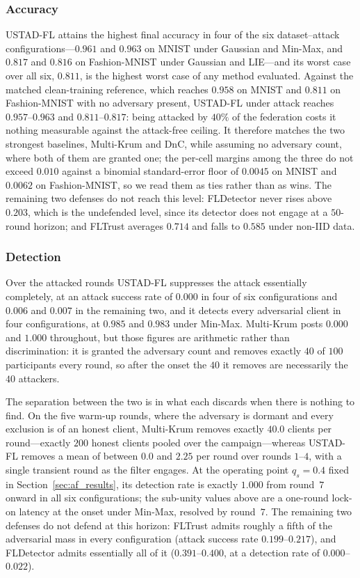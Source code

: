 \documentclass[journal]{IEEEtran}
\begin{document}
\subsubsection{Accuracy}
USTAD-FL attains the highest final accuracy in four of the six dataset--attack configurations---$0.961$ and $0.963$ on MNIST under Gaussian and Min-Max, and $0.817$ and $0.816$ on Fashion-MNIST under Gaussian and LIE---and its worst case over all six, $0.811$, is the highest worst case of any method evaluated. Against the matched clean-training reference, which reaches $0.958$ on MNIST and $0.811$ on Fashion-MNIST with no adversary present, USTAD-FL under attack reaches $0.957$--$0.963$ and $0.811$--$0.817$: being attacked by $40\%$ of the federation costs it nothing measurable against the attack-free ceiling. It therefore matches the two strongest baselines, Multi-Krum and DnC, while assuming no adversary count, where both of them are granted one; the per-cell margins among the three do not exceed $0.010$ against a binomial standard-error floor of $0.0045$ on MNIST and $0.0062$ on Fashion-MNIST, so we read them as ties rather than as wins. The remaining two defenses do not reach this level: FLDetector never rises above $0.203$, which is the undefended level, since its detector does not engage at a $50$-round horizon; and FLTrust averages $0.714$ and falls to $0.585$ under non-IID data.

\subsubsection{Detection}
Over the attacked rounds USTAD-FL suppresses the attack essentially completely, at an attack success rate of $0.000$ in four of six configurations and $0.006$ and $0.007$ in the remaining two, and it detects every adversarial client in four configurations, at $0.985$ and $0.983$ under Min-Max. Multi-Krum posts $0.000$ and $1.000$ throughout, but those figures are arithmetic rather than discrimination: it is granted the adversary count and removes exactly $40$ of $100$ participants every round, so after the onset the $40$ it removes are necessarily the $40$ attackers.

The separation between the two is in what each discards when there is nothing to find. On the five warm-up rounds, where the adversary is dormant and every exclusion is of an honest client, Multi-Krum removes exactly $40.0$ clients per round---exactly $200$ honest clients pooled over the campaign---whereas USTAD-FL removes a mean of between $0.0$ and $2.25$ per round over rounds $1$--$4$, with a single transient round as the filter engages. At the operating point $q_s = 0.4$ fixed in Section~\ref{sec:af_results}, its detection rate is exactly $1.000$ from round~$7$ onward in all six configurations; the sub-unity values above are a one-round lock-on latency at the onset under Min-Max, resolved by round~$7$. The remaining two defenses do not defend at this horizon: FLTrust admits roughly a fifth of the adversarial mass in every configuration (attack success rate $0.199$--$0.217$), and FLDetector admits essentially all of it ($0.391$--$0.400$, at a detection rate of $0.000$--$0.022$).
\end{document}
